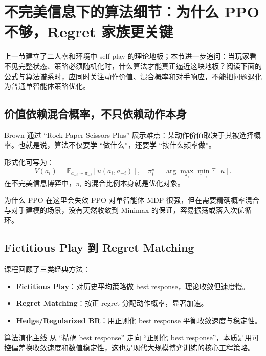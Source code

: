 \section{不完美信息下的算法细节：为什么 PPO 不够，Regret 家族更关键}

上一节建立了二人零和环境中 self-play 的理论地板；本节进一步追问：当玩家看不见完整状态、策略必须随机化时，什么算法才能真正逼近这块地板？阅读下面的公式与算法谱系时，应同时关注动作价值、混合概率和对手响应，不能把问题退化为普通单智能体策略优化。

\subsection{价值依赖混合概率，不只依赖动作本身}
Brown 通过 ``Rock-Paper-Scissors Plus'' 展示难点：某动作价值取决于其被选择概率。也就是说，算法不仅要学 ``做什么''，还要学 ``按什么频率做''。

形式化可写为：
\[
V(a_i) = \mathbb{E}_{a_{-i}\sim \pi_{-i}}[u(a_i, a_{-i})], \quad
\pi_i^\star = \arg\max_{\pi_i} \min_{\pi_{-i}} \mathbb{E}[u].
\]
在不完美信息博弈中，$\pi_i$ 的混合比例本身就是优化对象。

\begin{knowledgebox}{为什么 PPO 在这里会失效}
PPO 对单智能体 MDP 很强，但在需要精确概率混合与对手建模的场景，没有天然收敛到 Minimax 的保证，容易振荡或落入次优循环。
\end{knowledgebox}

\subsection{Fictitious Play 到 Regret Matching}
课程回顾了三类经典方法：
\begin{itemize}
    \item \textbf{Fictitious Play}：对历史平均策略做 best response，理论收敛但速度慢。
    \item \textbf{Regret Matching}：按正 regret 分配动作概率，显著加速。
    \item \textbf{Hedge/Regularized BR}：用正则化 best response 平衡收敛速度与稳定性。
\end{itemize}

\begin{importantbox}{算法演化主线}
从 ``精确 best response'' 走向 ``正则化 best response''，本质是用可控偏差换收敛速度和数值稳定性，这也是现代大规模博弈训练的核心工程策略。
\end{importantbox}


